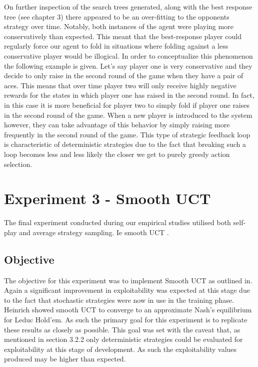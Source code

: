 On further inspection of the search trees generated, along with the best response tree (see chapter 3)
there appeared to be an over-fitting to the opponents strategy over time.
Notably, both instances of the agent were playing more conservatively than expected.
This meant that the best-response player could regularly force our agent to fold in
situations where folding against a less conservative player would be illogical.
In order to conceptualize this phenomenon the following example is given.
Let's say player one is very conservative and they decide to only raise in the second round of the game when they
have a pair of aces.
This means that over time player two will only receive highly negative rewards for the states in
which player one has raised in the second round.
In fact, in this case it is more beneficial for player two to simply fold if player one raises in
the second round of the game.
When a new player is introduced to the system however, they can take advantage of this
behavior by simply raising more frequently in the second round of the game.
This type of strategic feedback loop is characteristic of deterministic strategies due to the
fact that breaking such a loop becomes less and less likely the closer we get to purely greedy action selection.


\section{Experiment 3 - Smooth UCT}\label{sec:experiment3}
The final experiment conducted during our empirical studies utilised both self-play
and average strategy sampling.
Ie smooth UCT .

\subsection{Objective}\label{subsec:objective3}
The objective for this experiment was to implement Smooth UCT as outlined in\citep{heinrich2017reinforcement}.
Again a significant improvement in exploitability was expected at this stage due to the fact
that stochastic strategies were now in use in the training phase.
Heinrich showed smooth UCT to converge to an approximate Nash's equilibrium for Leduc Hold'em.
As such the primary goal for this experiment is to replicate these results as closely as possible.
This goal was set with the caveat that, as mentioned in section 3.2.2 only deterministic strategies
could be evaluated for exploitability at this stage of development.
As such the exploitability values produced may be higher than expected.


